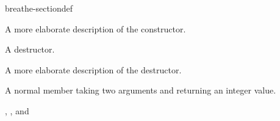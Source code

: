 \documentclass[letterpaper,10pt,english]{sphinxmanual}
\begin{document}
\begin{fulllineitems}
\begin{sphinxuseclass}{breathe-sectiondef}
\begin{fulllineitems}
\sphinxAtStartPar
A more elaborate description of the constructor. 

\end{fulllineitems}


\begin{fulllineitems}
\label{\detokenize{api/classQTstyle__Test:_CPPv4N12QTstyle_TestD0Ev}}
\pysigstartsignatures
\pysigstartmultiline
{}
\pysigstopmultiline
\pysigstopsignatures
\sphinxAtStartPar
A destructor. 

\sphinxAtStartPar
A more elaborate description of the destructor. 

\end{fulllineitems}


\begin{fulllineitems}
\label{\detokenize{api/classQTstyle__Test:_CPPv4N12QTstyle_Test6testMeEiPKc}}
\pysigstartsignatures
\pysigstartmultiline
{}
\pysigstopmultiline
\pysigstopsignatures
\sphinxAtStartPar
A normal member taking two arguments and returning an integer value. 

\sphinxAtStartPar


\nopagebreak


\sphinxAtStartPar
{\hyperref[\detokenize{api/classQTstyle__Test:classQTstyle__Test_1a14a296ea4e2ad446712f2310bec60766}]{}}, {\hyperref[\detokenize{api/classQTstyle__Test:classQTstyle__Test_1a7e82397d534d9a867f0857da01a46e9e}]{}}, {\hyperref[\detokenize{api/classQTstyle__Test:classQTstyle__Test_1ad5b201f097a720d44bf976c2f27efbda}]{}} and {\hyperref[\detokenize{api/classQTstyle__Test:classQTstyle__Test_1aabf7b2e9ed83ea44aca4d213baae06d3}]{}} 




\end{fulllineitems}
\end{sphinxuseclass}
\end{fulllineitems}
\end{document}
